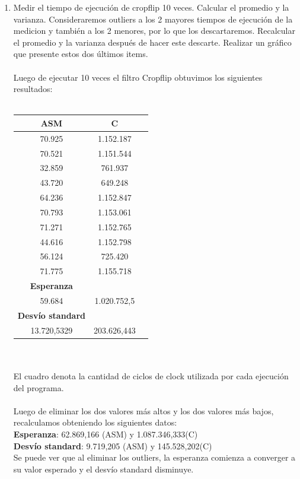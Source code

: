 \begin{enumerate}
    \item Medir el tiempo de ejecución de cropflip 10 veces. Calcular el promedio y la varianza. Consideraremos outliers a los 2 mayores tiempos de ejecución de la medicion y también a los 2 menores, por lo que los descartaremos. Recalcular el promedio y la varianza después de hacer este descarte. Realizar un gráfico que presente estos dos últimos items.\\
\\
Luego de ejecutar 10 veces el filtro Cropflip obtuvimos los siguientes resultados: \\
\\
    	\begin{tabular}[c]{|c|c|c|}
	\hline
		\textbf{ASM} & \textbf{C}\\
		\hline
70.925 &	1.152.187\\
		\hline
70.521 &	1.151.544\\
		\hline
32.859 &	761.937\\
		\hline
43.720 &	649.248\\
		\hline
64.236 &	1.152.847\\
		\hline
70.793 &	1.153.061\\
		\hline
71.271 &	1.152.765\\
		\hline
44.616 &	1.152.798\\
		\hline
56.124 &	725.420\\
		\hline
71.775 &	1.155.718\\
		\hline
	\textbf{Esperanza}	\\
		\hline
59.684 & 1.020.752,5	\\
		\hline
		\textbf{Desvío standard}	\\
		\hline
13.720,5329 & 203.626,443	\\
		\hline
	\end{tabular}\\\\
	El cuadro denota la cantidad de ciclos de clock utilizada por cada ejecuci\'on del programa. \\
	\\
	Luego de eliminar los dos valores m\'as altos y los dos valores m\'as bajos, recalculamos obteniendo los siguientes datos: \\
	\textbf{Esperanza}: 62.869,166
 (ASM) y 1.087.346,333(C)\\
	\textbf{Desvío standard}:	9.719,205 (ASM) y 145.528,202(C)\\
	Se puede ver que al eliminar los outliers, la esperanza comienza a converger a su valor esperado y el desvío standard disminuye. \\

\end{enumerate}
